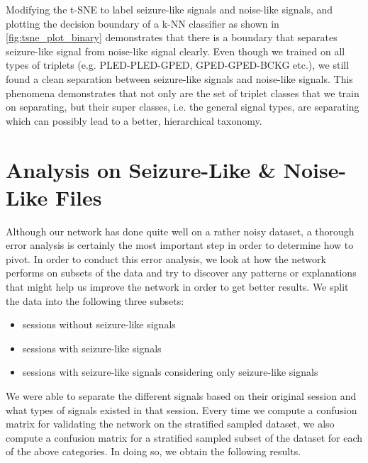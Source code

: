 Modifying the t-SNE to label seizure-like signals and noise-like signals, and plotting the decision boundary of a k-NN classifier as shown in \cref{fig:tsne_plot_binary} demonstrates that there is a boundary that separates seizure-like signal from noise-like signal clearly. Even though we trained on all types of triplets (e.g. PLED-PLED-GPED, GPED-GPED-BCKG etc.), we still found a clean separation between seizure-like signals and noise-like signals. This phenomena demonstrates that not only are the set of triplet classes that we train on separating, but their super classes, i.e. the general signal types, are separating which can possibly lead to a better, hierarchical taxonomy. 

\section{Analysis on Seizure-Like \& Noise-Like Files}
\label{analysis}
Although our network has done quite well on a rather noisy dataset, a thorough error analysis is certainly the most important step in order to determine how to pivot. In order to conduct this error analysis, we look at how the network performs on subsets of the data and try to discover any patterns or explanations that might help us improve the network in order to get better results. We split the data into the following three subsets: 
\begin{itemize}
	\setlength\itemsep{1mm}
	\item sessions without seizure-like signals
	\item sessions with seizure-like signals
	\item sessions with seizure-like signals considering only seizure-like signals
\end{itemize}
   
We were able to separate the different signals based on their original session and what types of signals existed in that session. Every time we compute a confusion matrix for validating the network on the stratified sampled dataset, we also compute a confusion matrix for a stratified sampled subset of the dataset for each of the above categories. In doing so, we obtain the following results. 

